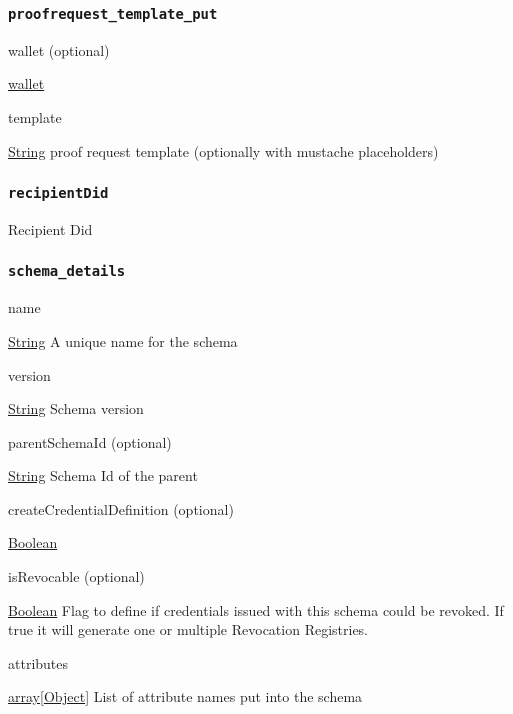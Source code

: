 \hypertarget{proofrequest_template_put}{%
\subsubsection{\texorpdfstring{\protect\hypertarget{proofrequest_template_put}{}{\texttt{proofrequest\_template\_put}}}{proofrequest\_template\_put}}\label{proofrequest_template_put}}

wallet (optional)

{\protect\hyperlink{wallet}{wallet}}

template

{\protect\hyperlink{string}{String}} proof request template (optionally
with mustache placeholders)

\hypertarget{recipientdid}{%
\subsubsection{\texorpdfstring{\protect\hypertarget{recipientDid}{}{\texttt{recipientDid}}}{recipientDid}}\label{recipientdid}}

Recipient Did

\hypertarget{schema_details}{%
\subsubsection{\texorpdfstring{\protect\hypertarget{schema_details}{}{\texttt{schema\_details}}}{schema\_details}}\label{schema_details}}

name

{\protect\hyperlink{string}{String}} A unique name for the schema

version

{\protect\hyperlink{string}{String}} Schema version

parentSchemaId (optional)

{\protect\hyperlink{string}{String}} Schema Id of the parent

createCredentialDefinition (optional)

{\protect\hyperlink{boolean}{Boolean}}

isRevocable (optional)

{\protect\hyperlink{boolean}{Boolean}} Flag to define if credentials
issued with this schema could be revoked. If true it will generate one
or multiple Revocation Registries.

attributes

{\protect\hyperlink{object}{array{[}Object{]}}} List of attribute names
put into the schema


